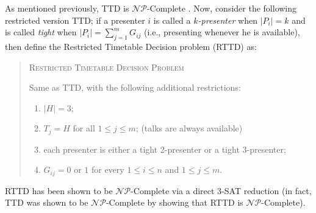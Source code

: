 \documentclass[]{article}
\theoremstyle{definition}
\theoremstyle{remark}
\numberwithin{equation}{section}
\newcommand{\cNP}{$\mathcal{NP}$}
\begin{document}
As mentioned previously, TTD is \cNP-Complete \cite{even76}. Now, consider the following restricted version TTD; if a presenter $i$ is called a $k$\textit{-presenter} when $|P_i|=k$ and is called \textit{tight} when $|P_i|=\sum\limits_{j=1}^{m} G_{ij}$ (i.e., presenting whenever he is available), then define the Restricted Timetable Decision problem (RTTD) as:
\begin{quote}
	\textsc{Restricted Timetable Decision Problem}
	
	Same as TTD, with the following additional restrictions:
	\begin{enumerate}
		\item $|H|=3$;
		\item $T_j = H$ for all $1 \le j \le m$; (talks are always available)
		\item each presenter is either a tight 2-presenter or a tight 3-presenter;
		\item $G_{ij}=0$ or $1$ for every $1 \le i \le n$ and $1 \le j \le m$.
	\end{enumerate}
\end{quote}
RTTD has been shown to be \cNP-Complete via a direct 3-SAT reduction \cite{even76} (in fact, TTD was shown to be \cNP-Complete by showing that RTTD is \cNP-Complete).
\end{document}
